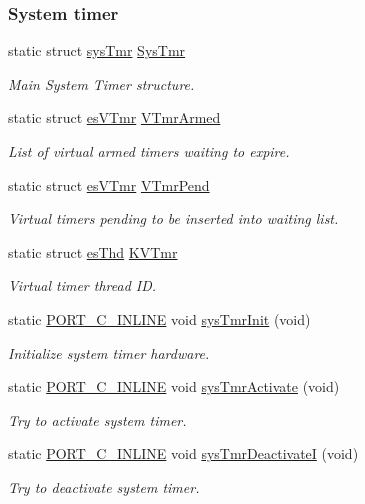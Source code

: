 \subsubsection*{System timer}
\begin{DoxyCompactItemize}
\item 
static struct \hyperlink{structsysTmr}{sys\-Tmr} \hyperlink{group__kern__impl_gaf4fd8bfc453bbab3d94186c863a180c0}{Sys\-Tmr}
\begin{DoxyCompactList}\small\item\em Main System Timer structure. \end{DoxyCompactList}\item 
static struct \hyperlink{structesVTmr}{es\-V\-Tmr} \hyperlink{group__kern__impl_ga49813e0a9a014d99d076943e96b2408c}{V\-Tmr\-Armed}
\begin{DoxyCompactList}\small\item\em List of virtual armed timers waiting to expire. \end{DoxyCompactList}\item 
static struct \hyperlink{structesVTmr}{es\-V\-Tmr} \hyperlink{group__kern__impl_gac27c4e18276b392295b973fc00f31765}{V\-Tmr\-Pend}
\begin{DoxyCompactList}\small\item\em Virtual timers pending to be inserted into waiting list. \end{DoxyCompactList}\item 
static struct \hyperlink{structesThd}{es\-Thd} \hyperlink{group__kern__impl_gaab82048477ffd940e6eff13d4280eb72}{K\-V\-Tmr}
\begin{DoxyCompactList}\small\item\em Virtual timer thread I\-D. \end{DoxyCompactList}\item 
static \hyperlink{group__template__compiler_ga87952d6e574c7f437503926e833ba345}{P\-O\-R\-T\-\_\-\-C\-\_\-\-I\-N\-L\-I\-N\-E} void \hyperlink{group__kern__impl_gaa284b6ec458b79a49c54eedc738259fb}{sys\-Tmr\-Init} (void)
\begin{DoxyCompactList}\small\item\em Initialize system timer hardware. \end{DoxyCompactList}\item 
static \hyperlink{group__template__compiler_ga87952d6e574c7f437503926e833ba345}{P\-O\-R\-T\-\_\-\-C\-\_\-\-I\-N\-L\-I\-N\-E} void \hyperlink{group__kern__impl_gaac3698a7627e9d0b7b1f0d5f741d2816}{sys\-Tmr\-Activate} (void)
\begin{DoxyCompactList}\small\item\em Try to activate system timer. \end{DoxyCompactList}\item 
static \hyperlink{group__template__compiler_ga87952d6e574c7f437503926e833ba345}{P\-O\-R\-T\-\_\-\-C\-\_\-\-I\-N\-L\-I\-N\-E} void \hyperlink{group__kern__impl_gab564a700462dce0be7ba31f2d3022f7b}{sys\-Tmr\-Deactivate\-I} (void)
\begin{DoxyCompactList}\small\item\em Try to deactivate system timer. \end{DoxyCompactList}\end{DoxyCompactItemize}
